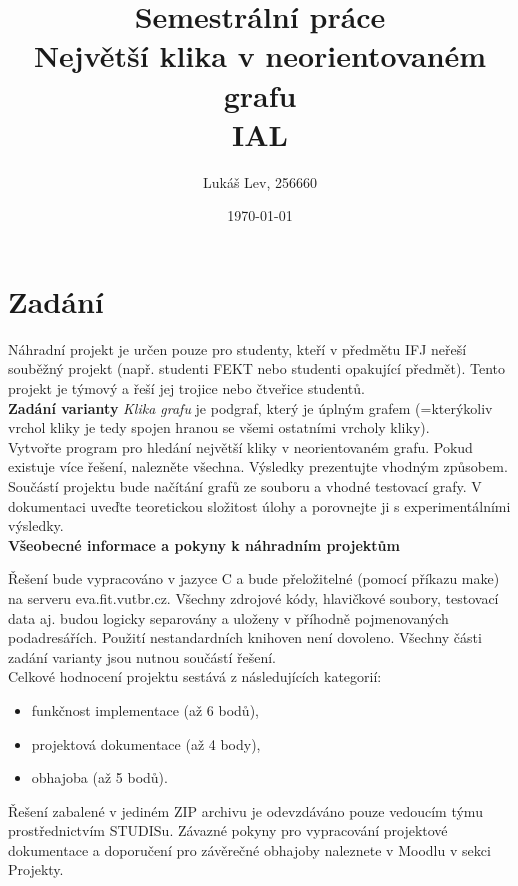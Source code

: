 \documentclass[a4paper]{article}
\title{\textbf{Semestrální práce}\\Největší klika v neorientovaném grafu\\[5pt]IAL}
\author{Lukáš Lev, 256660}
\date{\today}
\begin{document}
\maketitle
\newpage

\section{Zadání} \label{sec:zadani}
    Náhradní projekt je určen pouze pro studenty, kteří v předmětu IFJ neřeší souběžný projekt (např. studenti FEKT nebo studenti opakující předmět). Tento projekt je týmový a řeší jej trojice nebo čtveřice studentů.\\
    
    \noindent
    \textbf{Zadání varianty}
    \textit{Klika grafu} je podgraf, který je úplným grafem (=kterýkoliv vrchol kliky je tedy spojen hranou se všemi ostatními vrcholy kliky).\\
    
    \noindent
    Vytvořte program pro hledání největší kliky v neorientovaném grafu. Pokud existuje více řešení, nalezněte všechna. Výsledky prezentujte vhodným způsobem. Součástí projektu bude načítání grafů ze souboru a vhodné testovací grafy. V dokumentaci uveďte teoretickou složitost úlohy a porovnejte ji s experimentálními výsledky.\\
    
    \noindent
    \textbf{Všeobecné informace a pokyny k náhradním projektům}
    
    \noindent
    Řešení bude vypracováno v jazyce C a bude přeložitelné (pomocí příkazu make) na serveru eva.fit.vutbr.cz. Všechny zdrojové kódy, hlavičkové soubory, testovací data aj. budou logicky separovány a uloženy v příhodně pojmenovaných podadresářích. Použití nestandardních knihoven není dovoleno. Všechny části zadání varianty jsou nutnou součástí řešení.\\
    
    \noindent
    Celkové hodnocení projektu sestává z následujících kategorií:
    \begin{itemize}
        \item funkčnost implementace (až 6 bodů),
        \item projektová dokumentace (až 4 body),
        \item obhajoba (až 5 bodů).
    \end{itemize}
    
    \noindent
    Řešení zabalené v jediném ZIP archivu je odevzdáváno pouze vedoucím týmu prostřednictvím STUDISu. Závazné pokyny pro vypracování projektové dokumentace a doporučení pro závěrečné obhajoby naleznete v Moodlu v sekci Projekty.
    
\end{document}
